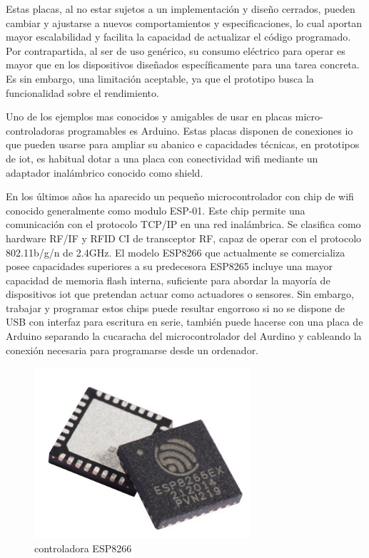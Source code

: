 \vspace{1.5cm}

Estas placas, al no estar sujetos a un implementación y diseño cerrados, pueden cambiar y ajustarse a nuevos comportamientos y especificaciones, lo cual aportan mayor escalabilidad y facilita la capacidad de actualizar el código programado. Por contrapartida, al ser de uso genérico, su consumo eléctrico para operar es mayor que en los dispositivos diseñados específicamente para una tarea concreta. Es sin embargo, una limitación aceptable, ya que el prototipo busca la funcionalidad sobre el rendimiento.

\vspace{1.5cm}

Uno de los ejemplos mas conocidos y amigables de usar en placas micro-controladoras programables es Arduino. Estas placas disponen de conexiones \gls{io} que pueden usarse para ampliar su abanico e capacidades técnicas, en prototipos de \gls{iot}, es habitual dotar a una placa con conectividad \gls{wifi} mediante un adaptador inalámbrico conocido como shield.

\vspace{1.5cm}

En los últimos años ha aparecido un pequeño microcontrolador con chip de \gls{wifi} conocido generalmente como modulo ESP-01. Este chip permite una comunicación con el protocolo TCP/IP en una red inalámbrica. Se clasifica como hardware RF/IF y RFID CI de transceptor RF, capaz de operar con el protocolo 802.11b/g/n  de 2.4GHz. El modelo ESP8266 que actualmente se comercializa posee capacidades superiores a su predecesora ESP8265 incluye una mayor capacidad de memoria flash interna, suficiente para abordar la mayoría de dispositivos \gls{iot} que pretendan actuar como actuadores o sensores.
Sin embargo, trabajar y programar estos chips puede resultar engorroso si no se dispone de USB con interfaz para escritura en serie, también puede hacerse con una placa de Arduino separando la cucaracha del microcontrolador del Aurdino y cableando la conexión necesaria para programarse desde un ordenador.

\begin{figure}[hbt!]
\centering
\includegraphics[height=2.5in]{figures/esp8266ex.jpg}
\caption[controladora ESP8233]{controladora ESP8266\footnotemark}
\end{figure}

